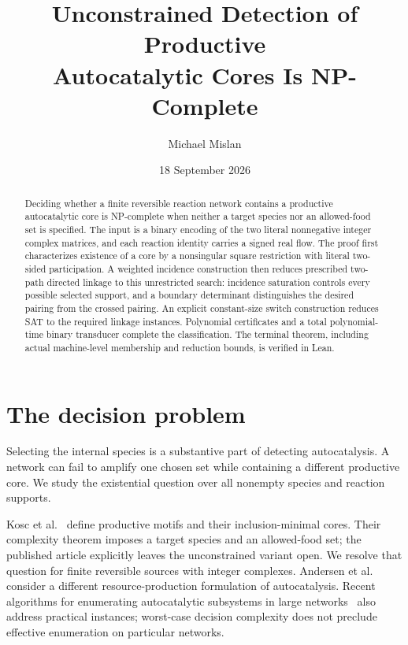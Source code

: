 \documentclass[11pt,a4paper]{article}
\title{Unconstrained Detection of Productive\\Autocatalytic Cores Is NP-Complete}
\author{Michael Mislan}
\date{18 September 2026}
\begin{document}
\maketitle
\begin{abstract}
Deciding whether a finite reversible reaction network contains a productive
autocatalytic core is NP-complete when neither a target species nor an
allowed-food set is specified. The input is a binary encoding
of the two literal nonnegative integer complex matrices, and each reaction
identity carries a signed real flow. The proof first characterizes existence
of a core by a nonsingular square restriction with literal two-sided
participation. A weighted incidence construction then reduces prescribed
two-path directed linkage to this unrestricted search: incidence saturation
controls every possible selected support, and a boundary determinant
distinguishes the desired pairing from the crossed pairing. An explicit
constant-size switch construction reduces SAT to the required linkage
instances. Polynomial certificates and a total polynomial-time binary
transducer complete the classification. The terminal theorem, including
actual machine-level membership and reduction bounds, is verified in Lean.
\end{abstract}

\section{The decision problem}
Selecting the internal species is a substantive part of detecting
autocatalysis. A network can fail to amplify one chosen set while containing
a different productive core. We study the existential question over all
nonempty species and reaction supports.

Kosc et al.~\cite{kosc} define productive motifs and their inclusion-minimal
cores. Their complexity theorem imposes a target species and an allowed-food
set; the published article explicitly leaves the unconstrained variant
open. We resolve that question for finite reversible sources with integer
complexes. Andersen et al.~\cite{andersen} consider a different
resource-production formulation of autocatalysis. Recent algorithms for
enumerating autocatalytic subsystems in large networks~\cite{enumeration}
also address practical instances; worst-case decision complexity does not
preclude effective enumeration on particular networks.
\end{document}

